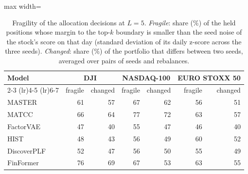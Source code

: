 \begin{table}[htbp]
\centering
\small
\begin{adjustbox}{max width=\textwidth}
\begin{tabular}{@{}lrrrrrr@{}}
\toprule
\textbf{Model} & \multicolumn{2}{c}{\textbf{DJI}} & \multicolumn{2}{c}{\textbf{NASDAQ-100}} & \multicolumn{2}{c}{\textbf{EURO STOXX 50}} \\
\cmidrule(lr){2-3} \cmidrule(lr){4-5} \cmidrule(lr){6-7}
 & fragile & changed & fragile & changed & fragile & changed \\
\midrule
MASTER & 61 & 57 & 67 & 62 & 56 & 51 \\
MATCC & 66 & 64 & 77 & 72 & 63 & 57 \\
FactorVAE & 47 & 40 & 55 & 47 & 46 & 40 \\
HIST & 48 & 43 & 56 & 49 & 60 & 52 \\
DiscoverPLF & 52 & 47 & 56 & 50 & 55 & 49 \\
FinFormer & 76 & 69 & 67 & 53 & 63 & 55 \\
\bottomrule
\end{tabular}
\end{adjustbox}
\caption{Fragility of the allocation decisions at $L = 5$. \emph{Fragile}: share (\%) of the held positions whose margin to the top-$k$ boundary is smaller than the seed noise of the stock's score on that day (standard deviation of its daily z-score across the three seeds). \emph{Changed}: share (\%) of the portfolio that differs between two seeds, averaged over pairs of seeds and rebalances.}
\label{tab:pf_fragility}
\end{table}
